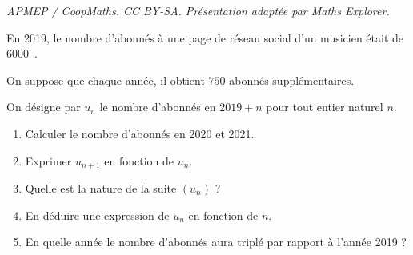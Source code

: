 \documentclass[10pt]{article}
\providecommand{\np}[2][]{{#2~#1}}
\begin{document}
\noindent\textit{APMEP / CoopMaths. CC BY-SA. Présentation adaptée par Maths Explorer.}\par\medskip
\medskip

En 2019, le nombre d'abonnés à une page de réseau social d'un musicien était de \np{6000}. 

On suppose que chaque année, il obtient $750$ abonnés supplémentaires.

On désigne par $u_n$ le nombre d'abonnés en $2019 + n$ pour tout entier naturel $n$.

\medskip

\begin{enumerate}
\item Calculer le nombre d'abonnés en 2020 et 2021.
\item Exprimer $u_{n+1}$ en fonction de $u_n$.
\item Quelle est la nature de la suite $\left(u_n\right)$ ?
\item En déduire une expression de $u_n$ en fonction de $n$.
\item En quelle année le nombre d'abonnés aura triplé par rapport à l'année 2019 ?
\end{enumerate}

\bigskip
\end{document}
